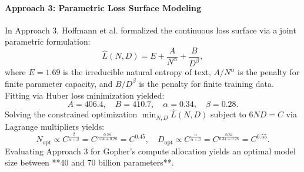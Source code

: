 \documentclass[../../../main.tex]{subfiles}
\begin{document}
\paragraph{Approach 3: Parametric Loss Surface Modeling}
In Approach 3, Hoffmann et al. formalized the continuous loss surface via a joint parametric formulation:
\begin{equation}
\hat{L}(N, D) = E + \frac{A}{N^\alpha} + \frac{B}{D^\beta},
\label{eq:parametric_loss_surface}
\end{equation}
where $E = 1.69$ is the irreducible natural entropy of text, $A / N^\alpha$ is the penalty for finite parameter capacity, and $B / D^\beta$ is the penalty for finite training data. Fitting via Huber loss minimization yielded:
\begin{equation}
A = 406.4, \quad B = 410.7, \quad \alpha = 0.34, \quad \beta = 0.28.
\label{eq:chinchilla_fitted_params}
\end{equation}
Solving the constrained optimization $\min_{N, D} \hat{L}(N, D)$ subject to $6ND = C$ via Lagrange multipliers yields:
\begin{equation}
N_{\text{opt}} \propto C^{\frac{\beta}{\alpha + \beta}} = C^{\frac{0.28}{0.34+0.28}} = C^{0.45}, \quad D_{\text{opt}} \propto C^{\frac{\alpha}{\alpha + \beta}} = C^{\frac{0.34}{0.34+0.28}} = C^{0.55}.
\label{eq:chinchilla_approach3_exponents}
\end{equation}
Evaluating Approach 3 for Gopher's compute allocation yields an optimal model size between **40 and 70 billion parameters**.
\end{document}
